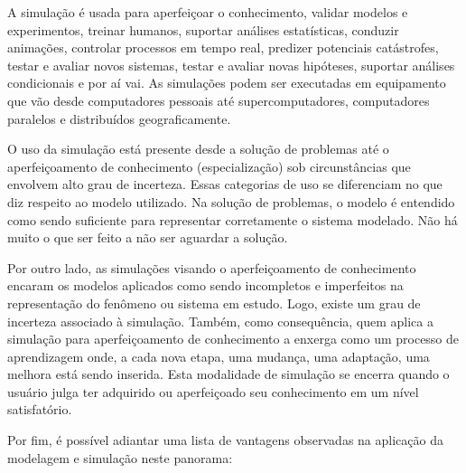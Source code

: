 \documentclass[a4paper,12pt,oneside,onecolumn]{uerj/uerj}
\begin{document}
A simulação é usada para aperfeiçoar o conhecimento, validar modelos e experimentos, treinar humanos, suportar análises estatísticas, conduzir animações, controlar processos em tempo real, predizer potenciais catástrofes, testar e avaliar novos sistemas, testar e avaliar novas hipóteses, suportar análises condicionais e por aí vai. As simulações podem ser executadas em equipamento que vão desde computadores pessoais até supercomputadores, computadores paralelos e distribuídos geograficamente.

O uso da simulação está presente desde a solução de problemas até o aperfeiçoamento de conhecimento (especialização) sob circunstâncias que envolvem alto grau de incerteza. Essas categorias de uso se diferenciam no que diz respeito ao modelo utilizado. Na solução de problemas, o modelo é entendido como sendo suficiente para representar corretamente o sistema modelado. Não há muito o que ser feito a não ser aguardar a solução.

Por outro lado, as simulações visando o aperfeiçoamento de conhecimento encaram os modelos aplicados como sendo incompletos e imperfeitos na representação do fenômeno ou sistema em estudo. Logo, existe um grau de incerteza associado à simulação. Também, como consequência, quem aplica a simulação para aperfeiçoamento de conhecimento a enxerga como um processo de aprendizagem onde, a cada nova etapa, uma mudança, uma adaptação, uma melhora está sendo inserida. Esta modalidade de simulação se encerra quando o usuário julga ter adquirido ou aperfeiçoado seu conhecimento em um nível satisfatório.

Por fim, é possível adiantar uma lista de vantagens observadas na aplicação da modelagem e simulação neste panorama:
\end{document}
